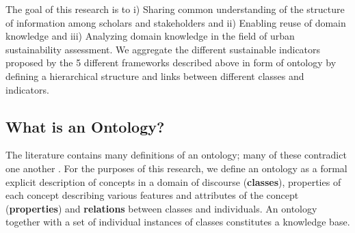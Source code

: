 \documentclass[preprint,12pt]{elsarticle}
\begin{document}
The goal of this research is to i) Sharing common understanding of the structure of information among scholars and stakeholders and ii) Enabling reuse of domain knowledge and iii) Analyzing domain knowledge in the field of urban sustainability assessment. We aggregate the different sustainable indicators proposed by the 5 different frameworks described above in form of ontology by defining a hierarchical structure and links between different classes and indicators.

\subsection{What is an Ontology?}
The literature contains many definitions of an ontology; many of these contradict one another \cite{guarino2009ontology}. For the purposes of this research, we define an ontology as a formal explicit description of concepts in a domain of discourse (\textbf{classes}), properties of each concept describing various features and attributes of the concept (\textbf{properties}) and \textbf{relations} between classes and individuals. An ontology together with a set of individual instances of classes constitutes a knowledge base. 
\end{document}
